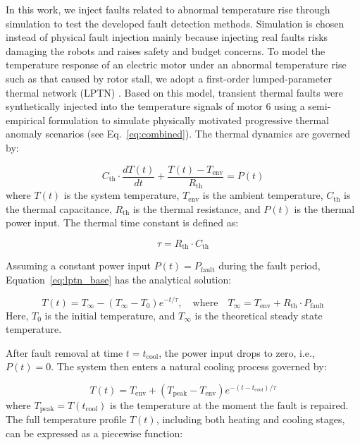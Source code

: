 \documentclass[a4paper,10pt]{cas-sc}%
\newcommand{\rev}[1]{#1}
\newcommand{\roundtworev}[1]{\textcolor{roundtwored}{#1}}
\begin{document}
\rev{In this work, we inject faults related to abnormal temperature rise through simulation to test the developed fault detection methods. Simulation is chosen instead of physical fault injection mainly because injecting real faults risks damaging the robots and raises safety and budget concerns. To model the temperature response of an electric motor under an abnormal temperature rise such as that caused by rotor stall, we adopt a first-order lumped-parameter thermal network (LPTN) \citep{khalesidoost2022overview, sciascera2017analytical, boglietti2009evolution, ramarathnam2015review}.} Based on this model, transient thermal faults were synthetically injected into the temperature signals of motor 6 using a semi-empirical formulation \roundtworev{to simulate physically motivated progressive thermal anomaly scenarios} (see Eq.~\eqref{eq:combined}). The thermal dynamics are governed by:

\begin{equation}
	C_{\mathrm{th}} \cdot \frac{dT(t)}{dt} + \frac{T(t) - T_{\mathrm{env}}}{R_{\mathrm{th}}} = P(t)
	\label{eq:lptn_base}
\end{equation}
where \( T(t) \) is the system temperature, \( T_{\mathrm{env}} \) is the ambient temperature, \( C_{\mathrm{th}} \) is the thermal capacitance, \( R_{\mathrm{th}} \) is the thermal resistance, and \( P(t) \) is the thermal power input. The thermal time constant is defined as:

\[
	\tau = R_{\mathrm{th}} \cdot C_{\mathrm{th}}
\]

Assuming a constant power input \( P(t) = P_{\mathrm{fault}} \) during the fault period, Equation~\eqref{eq:lptn_base} has the analytical solution:

\begin{equation}
	T(t) = T_{\infty} - \left( T_{\infty} - T_0 \right) e^{-t/\tau}, \quad \text{where} \quad T_{\infty} = T_{\mathrm{env}} + R_{\mathrm{th}} \cdot P_{\mathrm{fault}}
	\label{eq:heating}
\end{equation}
Here, \( T_0 \) is the initial temperature, and \( T_{\infty} \) is the theoretical steady state temperature.

After fault removal at time \( t = t_{\mathrm{cool}} \), the power input drops to zero, i.e., \( P(t) = 0 \). The system then enters a natural cooling process governed by:

\begin{equation}
	T(t) = T_{\mathrm{env}} + \left( T_{\mathrm{peak}} - T_{\mathrm{env}} \right) e^{-(t - t_{\mathrm{cool}})/\tau}
	\label{eq:cooling}
\end{equation}
where \( T_{\mathrm{peak}} = T(t_{\mathrm{cool}}) \) is the temperature at the moment the fault is repaired. The full temperature profile \( T(t) \), including both heating and cooling stages, can be expressed as a piecewise function:
\end{document}
